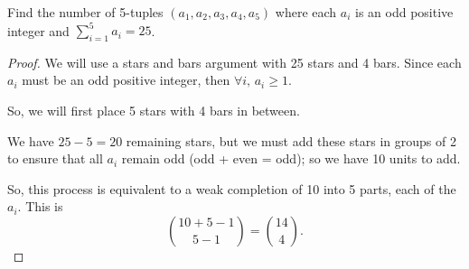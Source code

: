 \documentclass{article}
\begin{document}
Find the number of 5-tuples $(a_1,a_2,a_3,a_4,a_5)$ where each $a_i$ is an odd positive integer and $\sum_{i=1}^5 a_i = 25$.
\begin{proof}
	We will use a stars and bars argument with 25 stars and 4 bars.
	Since each $a_i$ must be an odd positive integer, then  $\forall i,\, a_i\ge 1$.

	So, we will first place 5 stars with 4 bars in between.

	We have $25-5=20$ remaining stars, but we must add these stars in groups of 2 to ensure that all  $a_i$ remain odd (odd + even = odd); so we have 10 units to add.

	So, this process is equivalent to a weak completion of  10 into 5 parts, each of the $a_i$.
	This is  \[
		\binom{10+5-1}{5-1}=\binom{14}{4}
		.\]
\end{proof}
\end{document}
